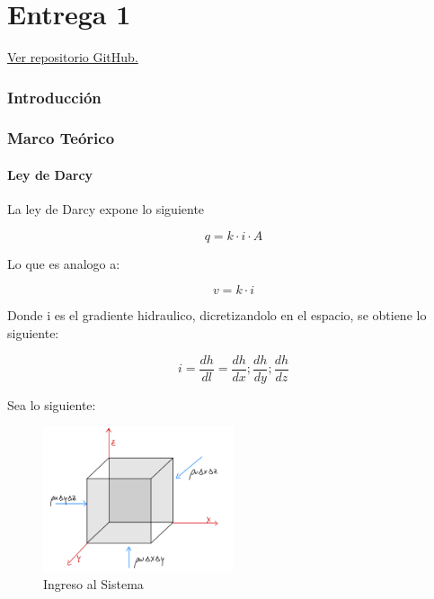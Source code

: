 \part{Entrega 1}

\begin{center}
    \href{https://github.com/LukasWolff2002/PROYECTO_1_MCOC_ENTREGA_1}{Ver repositorio GitHub.}
\end{center}

\setcounter{section}{0}

\section{Introducción}

\section{Marco Teórico}

\subsection{Ley de Darcy}

La ley de Darcy expone lo siguiente

\begin{equation}
    q = k \cdot i \cdot A
\end{equation}

Lo que es analogo a:

\begin{equation}
    v = k \cdot i
\end{equation}

Donde i es el gradiente hidraulico, dicretizandolo en el espacio, se obtiene lo siguiente:

\begin{equation}
    i = \frac{dh}{dl} = \frac{dh}{dx};\frac{dh}{dy};\frac{dh}{dz}
\end{equation}

Sea lo siguiente:

\begin{figure}[H]
    \centering
    \includegraphics[width=0.5\textwidth]{FOTOS/in.jpg}
    \caption{Ingreso al Sistema}
    \label{fig:ley_darcy}
\end{figure}

